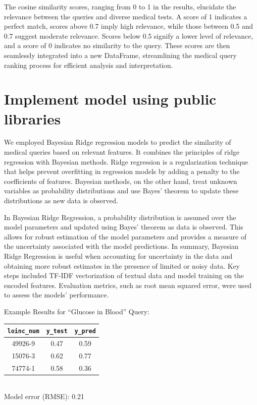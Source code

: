 \documentclass[12pt]{article}
\begin{document}
The cosine similarity scores, ranging from 0 to 1 in the results, elucidate the relevance between the queries and diverse medical tests. A score of 1 indicates a perfect match, scores above 0.7 imply high relevance, while those between 0.5 and 0.7 suggest moderate relevance. Scores below 0.5 signify a lower level of relevance, and a score of 0 indicates no similarity to the query. These scores are then seamlessly integrated into a new DataFrame, streamlining the medical query ranking process for efficient analysis and interpretation.


\section{Implement model using public libraries}

We employed Bayesian Ridge regression models to predict the similarity of medical queries based on relevant features. It combines the principles of ridge regression with Bayesian methods. Ridge regression is a regularization technique that helps prevent overfitting in regression models by adding a penalty to the coefficients of features. Bayesian methods, on the other hand, treat unknown variables as probability distributions and use Bayes' theorem to update these distributions as new data is observed.

In Bayesian Ridge Regression, a probability distribution is assumed over the model parameters and updated using Bayes' theorem as data is observed. This allows for robust estimation of the model parameters and provides a measure of the uncertainty associated with the model predictions. In summary, Bayesian Ridge Regression is useful when accounting for uncertainty in the data and obtaining more robust estimates in the presence of limited or noisy data. Key steps included TF-IDF vectorization of textual data and model training on the encoded features. Evaluation metrics, such as root mean squared error, were used to assess the models' performance.

Example Results for ``Glucose in Blood'' Query:

\begin{table}[H]
	\centering
    \begin{tabular}{ccc}
        \toprule
        \texttt{loinc\_num} & \texttt{y\_test} & \texttt{y\_pred} \\
        \midrule
        49926-9 & 0.47 & 0.59 \\
        15076-3 & 0.62 & 0.77 \\
        74774-1 & 0.58 & 0.36 \\
        \bottomrule
    \end{tabular} \\
    Model error (RMSE): 0.21
\end{table}
\end{document}
